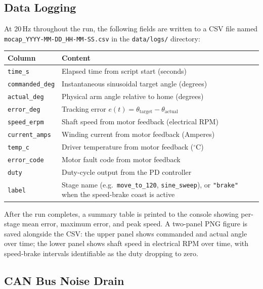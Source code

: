 \documentclass[12pt,a4paper]{article}
\begin{document}
\subsection{Data Logging}

At 20\,Hz throughout the run, the following fields are written to a CSV
file named \texttt{mocap\_YYYY-MM-DD\_HH-MM-SS.csv} in the
\texttt{data/logs/} directory:

\begin{center}
  \begin{tabular}{ll}
    \toprule
    Column & Content \\
    \midrule
    \texttt{time\_s}          & Elapsed time from script start (seconds) \\
    \texttt{commanded\_deg}   & Instantaneous sinusoidal target angle (degrees) \\
    \texttt{actual\_deg}      & Physical arm angle relative to home (degrees) \\
    \texttt{error\_deg}       & Tracking error $e(t) = \theta_{\text{target}} - \theta_{\text{actual}}$ \\
    \texttt{speed\_erpm}      & Shaft speed from motor feedback (electrical RPM) \\
    \texttt{current\_amps}    & Winding current from motor feedback (Amperes) \\
    \texttt{temp\_c}          & Driver temperature from motor feedback ($^\circ$C) \\
    \texttt{error\_code}      & Motor fault code from motor feedback \\
    \texttt{duty}             & Duty-cycle output from the PD controller \\
    \texttt{label}            & Stage name (e.g.\ \texttt{move\_to\_120},
                                \texttt{sine\_sweep}), or \texttt{"brake"}
                                when the speed-brake coast is active \\
    \bottomrule
  \end{tabular}
\end{center}

After the run completes, a summary table is printed to the console showing
per-stage mean error, maximum error, and peak speed.  A two-panel PNG
figure is saved alongside the CSV: the upper panel shows commanded and
actual angle over time; the lower panel shows shaft speed in electrical
RPM over time, with speed-brake intervals identifiable as the duty
dropping to zero.
\subsection{CAN Bus Noise Drain}
\label{sec:noise_drain}
\end{document}

